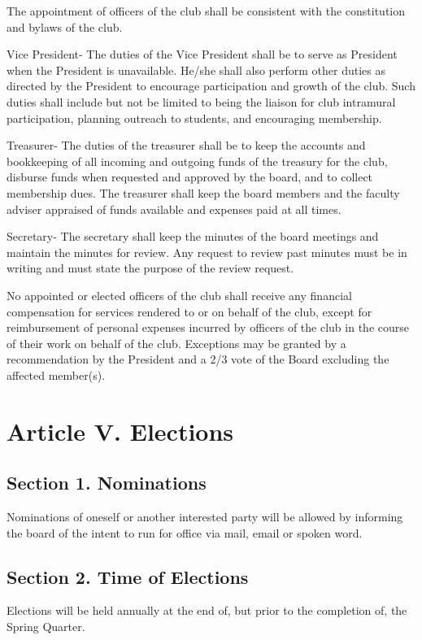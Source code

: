 \documentclass{article}
\begin{document}
The appointment of officers of the club shall be consistent with the constitution and bylaws of the club.


Vice President- The duties of the Vice President shall be to serve as President when the President is unavailable. He/she shall also perform other duties as directed by the President to encourage participation and growth of the club. Such duties shall include but not be limited to being the liaison for club intramural participation, planning outreach to students, and encouraging membership.

Treasurer- The duties of the treasurer shall be to keep the accounts and bookkeeping of all incoming and outgoing funds of the treasury for the club, disburse funds when requested and approved by the board, and to collect membership dues. The treasurer shall keep the board members and the faculty adviser appraised of funds available and expenses paid at all times.

Secretary- The secretary shall keep the minutes of the board meetings and maintain the minutes for review. Any request to review past minutes must be in writing and must state the purpose of the review request.

No appointed or elected officers of the club shall receive any financial compensation for services rendered to or on behalf of the club, except for reimbursement of personal expenses incurred by officers of the club in the course of their work on behalf of the club. Exceptions may be granted by a recommendation by the President and a 2/3 vote of the Board excluding the affected member(s).

\section{Article V. Elections}
  \subsection{Section 1. Nominations}
  Nominations of oneself or another interested party will be allowed by informing the board of the intent to run for office via mail, email or spoken word.

  \subsection{Section 2. Time of Elections}
  Elections will be held annually at the end of, but prior to the completion of, the Spring Quarter.
\end{document}
